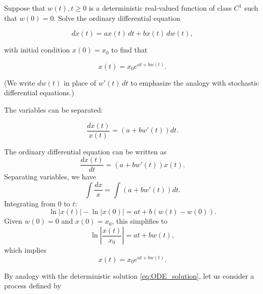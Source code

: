 \begin{Exercise}
\label{ex:7.18}
Suppose that $w(t), t \geq 0$ is a deterministic real-valued function of class $C^1$ such that $w(0) = 0$. Solve the ordinary differential equation

\begin{equation}
dx(t) = a x(t) \, dt + b x(t) \, dw(t),
\label{eq:ODE_with_w}
\end{equation}

with initial condition $x(0) = x_0$ to find that

\begin{equation}
x(t) = x_0 e^{at + bw(t)}.
\label{eq:ODE_solution}
\end{equation}

(We write $dw(t)$ in place of $w'(t) \, dt$ to emphasize the analogy with stochastic differential equations.)

\begin{hint}
The variables can be separated:

\begin{equation}
\frac{dx(t)}{x(t)} = \left(a + b w'(t)\right) dt.
\end{equation}
\end{hint}
\end{Exercise}

\begin{Solution}
The ordinary differential equation can be written as
\begin{equation*}
\frac{dx(t)}{dt} = (a + b w'(t)) x(t).
\end{equation*}
Separating variables, we have
\begin{equation*}
\int \frac{dx}{x} = \int (a + b w'(t)) dt.
\end{equation*}
Integrating from $0$ to $t$:
\begin{equation*}
\ln |x(t)| - \ln |x(0)| = at + b(w(t) - w(0)).
\end{equation*}
Given $w(0) = 0$ and $x(0) = x_0$, this simplifies to
\begin{equation*}
\ln \left| \frac{x(t)}{x_0} \right| = at + bw(t),
\end{equation*}
which implies
\begin{equation*}
x(t) = x_0 e^{at + bw(t)}.
\end{equation*}
\end{Solution}

By analogy with the deterministic solution \eqref{eq:ODE_solution}, let us consider a process defined by

